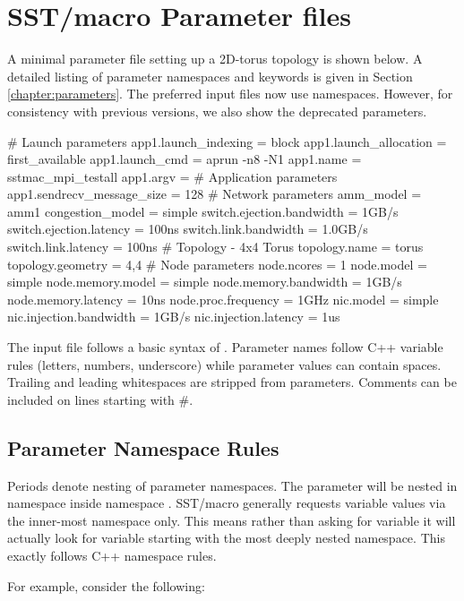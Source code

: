 
\section{SST/macro Parameter files}
\label{sec:parameters}
A minimal parameter file setting up a 2D-torus topology is shown below. 
A detailed listing of parameter namespaces and keywords is given in Section \ref{chapter:parameters}.
The preferred input files now use namespaces.
However, for consistency with previous versions, we also show the deprecated parameters.

\begin{ViFile}
# Launch parameters
app1.launch_indexing = block
app1.launch_allocation = first_available
app1.launch_cmd = aprun -n8 -N1
app1.name = sstmac_mpi_testall
app1.argv =
# Application parameters
app1.sendrecv_message_size = 128
# Network parameters
amm_model = amm1
congestion_model = simple
switch.ejection.bandwidth = 1GB/s
switch.ejection.latency = 100ns
switch.link.bandwidth = 1.0GB/s
switch.link.latency = 100ns
# Topology - 4x4 Torus
topology.name = torus
topology.geometry = 4,4
# Node parameters
node.ncores = 1
node.model = simple
node.memory.model = simple
node.memory.bandwidth = 1GB/s
node.memory.latency = 10ns
node.proc.frequency = 1GHz
nic.model = simple
nic.injection.bandwidth = 1GB/s
nic.injection.latency = 1us
\end{ViFile}
The input file follows a basic syntax of .  
Parameter names follow C++ variable rules (letters, numbers, underscore) while parameter values can contain spaces.  Trailing and leading whitespaces are stripped from parameters.
Comments can be included on lines starting with \#.

\subsection{Parameter Namespace Rules}
Periods denote nesting of parameter namespaces.
The parameter  will be nested in namespace  inside namespace .
SST/macro generally requests variable values via the inner-most namespace only.
This means rather than asking for variable  it will actually look for variable  starting with the most deeply nested namespace.
This exactly follows C++ namespace rules.

For example, consider the following:

